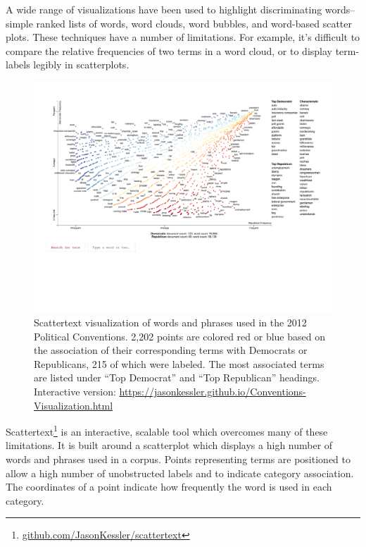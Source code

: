 \documentclass[11pt,a4paper]{article}
\begin{document}
A wide range of visualizations have been used to highlight discriminating words-- simple ranked lists of words, word clouds, word bubbles, and word-based scatter plots.  These techniques have a number of limitations.  For example, it's difficult to compare the relative frequencies of two terms in a word cloud, or to display term-labels legibly in scatterplots.
\begin{figure}[h!!]
  \includegraphics[width=\linewidth,scale=0.8]{primary_scattertext}
  \caption{Scattertext visualization of words and phrases used in the 2012 Political Conventions.  2,202 points are colored red or blue based on the association of their corresponding terms with Democrats or Republicans, 215 of which were labeled. The most associated terms are listed under ``Top Democrat'' and ``Top Republican'' headings. Interactive version: \href{https://jasonkessler.github.io/Conventions-Visualization.html}{https://jasonkessler.github.io/Conventions-Visualization.html}}
\label{scattertextmain}
\end{figure}

Scattertext\footnote{\href{http://www.github.com/JasonKessler/scattertext}{github.com/JasonKessler/scattertext}} is an interactive, scalable tool which overcomes many of these limitations.  It is built around a scatterplot which displays a high number of words and phrases used in a corpus.  Points representing terms are positioned to allow a high number of unobstructed labels and to indicate category association.  The coordinates of a point indicate how frequently the word is used in each category.  
\end{document}
